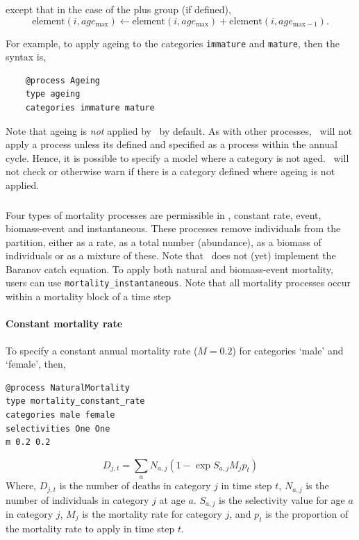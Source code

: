 except that in the case of the plus group (if defined), 
\begin{equation}
  \text{element}(i,age_{\text{max}}) \leftarrow \text{element}(i,age_{\text{max}}) + \text{element}(i,age_{\text{max}-1}).
\end{equation}

For example, to apply ageing to the categories \texttt{immature} and \texttt{mature}, then the syntax is,

{\small{\begin{verbatim}
	@process Ageing
	type ageing
	categories immature mature
	\end{verbatim}}}

Note that ageing is \emph{not} applied by \CNAME\ by default. As with other processes, \CNAME\ will not apply a process unless its defined and specified as a process within the annual cycle. Hence, it is possible to specify a model where a category is not aged. \CNAME\ will not check or otherwise warn if there is a category defined where ageing is not applied.

\subsubsection{\label{sec:mortality}}

Four types of mortality processes are permissible in \CNAME, constant rate, event, biomass-event and instantaneous. These processes remove individuals from the partition, either as a rate, as a total number (abundance), as a biomass of individuals or as a mixture of these. Note that \CNAME\ does not (yet) implement the Baranov catch equation. To apply both natural and biomass-event mortality, users can use \texttt{mortality\_instantaneous}. Note that all mortality processes occur within a mortality block of a time step

\paragraph{Constant mortality rate}

To specify a constant annual mortality rate ($M=0.2$) for categories `male' and `female', then, 
{\small{\begin{verbatim}
@process NaturalMortality
type mortality_constant_rate
categories male female
selectivities One One
m 0.2 0.2
\end{verbatim}}}

\begin{equation}
D_{j,t} = \sum_a N_{a,j} (1 - \exp{S_{a,j} M_j p_t})
\end{equation}
Where, $D_{j,t}$ is the number of deaths in category $j$ in time step $t$, $N_{a,j}$ is the number of individuals in category $j$ at age $a$. $S_{a,j}$ is the selectivity value for age $a$ in category $j$, $M_j$ is the mortality rate for category $j$, and $p_t$ is the proportion of the mortality rate to apply in time step $t$.

